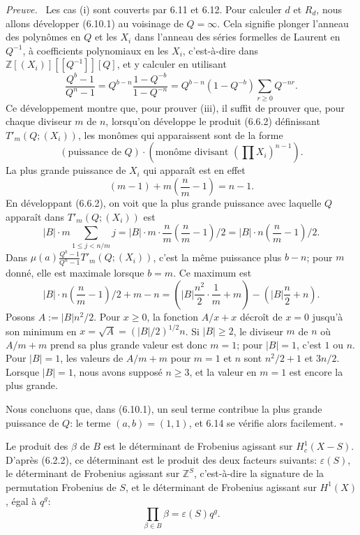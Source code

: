 \documentclass[10pt]{article}
\newcommand{\Z}{\mathbb Z}
\theoremstyle{deligne}
\newenvironment{proofdel}[1][Preuve.]{\textit{#1}\ }{\hfill$\square$}
\begin{document}
\begin{proofdel}
Les cas (i) sont couverts par 6.11 et 6.12. Pour calculer $d$ et $R_d$, nous allons développer (6.10.1) au voisinage de $Q=\infty$. Cela signifie plonger l'anneau des polynômes en $Q$ et les $X_i$ dans l'anneau des séries formelles de Laurent en $Q^{-1}$, à coefficients polynomiaux en les $X_i$, c'est-à-dire dans $\Z[(X_i)][[Q^{-1}]][Q]$, et y calculer en utilisant
\begin{equation}\tag{6.14.3}
\frac{Q^b-1}{Q^n-1}=Q^{b-n}\frac{1-Q^{-b}}{1-Q^{-n}}=Q^{b-n}(1-Q^{-b})\sum_{r\ge0}Q^{-nr}.
\end{equation}
Ce développement montre que, pour prouver (iii), il suffit de prouver que, pour chaque diviseur $m$ de $n$, lorsqu'on développe le produit (6.6.2) définissant $T'_m(Q;(X_i))$, les monômes qui apparaissent sont de la forme
\[
(\text{puissance de }Q)\cdot\left(\text{monôme divisant }\left(\prod X_i\right)^{n-1}\right).
\]
La plus grande puissance de $X_i$ qui apparaît est en effet
\[
(m-1)+m\left(\frac{n}{m}-1\right)=n-1.
\]
En développant (6.6.2), on voit que la plus grande puissance avec laquelle $Q$ apparaît dans $T'_m(Q;(X_i))$ est
\[
|B|\cdot m\sum_{1\le j<n/m}j
=|B|\cdot m\cdot\frac{n}{m}\left(\frac{n}{m}-1\right)/2
=|B|\cdot n\left(\frac{n}{m}-1\right)/2.
\]
Dans $\mu(a)\frac{Q^b-1}{Q^n-1}T'_m(Q;(X_i))$, c'est la même puissance plus $b-n$; pour $m$ donné, elle est maximale lorsque $b=m$. Ce maximum est
\begin{equation}\tag{6.14.4}
|B|\cdot n\left(\frac{n}{m}-1\right)/2+m-n
=\left(|B|\frac{n^2}{2}\cdot\frac1m+m\right)-\left(|B|\frac n2+n\right).
\end{equation}
Posons $A:=|B|n^2/2$. Pour $x\ge0$, la fonction $A/x+x$ décroît de $x=0$ jusqu'à son minimum en $x=\sqrt A=(|B|/2)^{1/2}n$. Si $|B|\ge2$, le diviseur $m$ de $n$ où $A/m+m$ prend sa plus grande valeur est donc $m=1$; pour $|B|=1$, c'est $1$ ou $n$. Pour $|B|=1$, les valeurs de $A/m+m$ pour $m=1$ et $n$ sont $n^2/2+1$ et $3n/2$. Lorsque $|B|=1$, nous avons supposé $n\ge3$, et la valeur en $m=1$ est encore la plus grande.

Nous concluons que, dans (6.10.1), un seul terme contribue la plus grande puissance de $Q$: le terme $(a,b)=(1,1)$, et 6.14 se vérifie alors facilement.
\end{proofdel}

Le produit des $\beta$ de $B$ est le déterminant de Frobenius agissant sur $H^1_c(X-S)$. D'après (6.2.2), ce déterminant est le produit des deux facteurs suivants: $\varepsilon(S)$, le déterminant de Frobenius agissant sur $\Z^S$, c'est-à-dire la signature de la permutation Frobenius de $S$, et le déterminant de Frobenius agissant sur $H^1(X)$, égal à $q^g$:
\begin{equation}\tag{6.14.5}
\prod_{\beta\in B}\beta=\varepsilon(S)q^g.
\end{equation}
\end{document}
